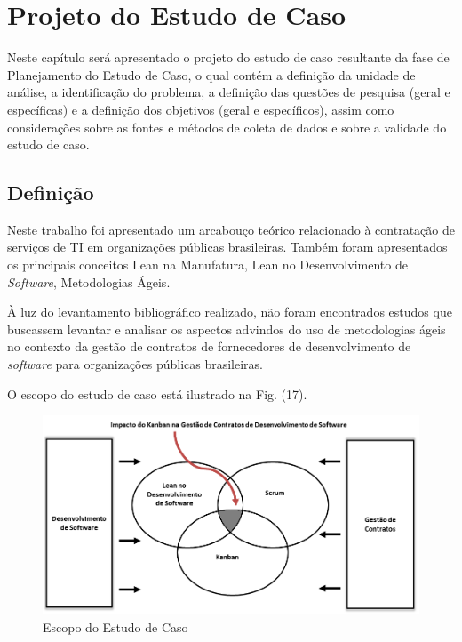 \chapter[Projeto do Estudo de Caso]{Projeto do Estudo de Caso}

Neste capítulo será apresentado o projeto do estudo de caso resultante da fase de Planejamento do Estudo de Caso, o qual contém a definição da unidade de análise,  a identificação do problema, a definição das questões de pesquisa (geral e específicas) e a definição dos objetivos (geral e específicos), assim como considerações sobre as fontes e métodos de coleta de dados e sobre a validade do estudo de caso.

\section[Definição]{Definição}

Neste trabalho foi apresentado um arcabouço teórico relacionado à contratação de serviços de TI em organizações públicas brasileiras. Também foram apresentados os principais conceitos Lean na Manufatura, Lean no Desenvolvimento de \textit{Software}, Metodologias Ágeis.

À luz do levantamento bibliográfico realizado, não foram encontrados estudos que buscassem levantar e analisar os aspectos advindos do uso de metodologias ágeis no contexto da gestão de contratos de fornecedores de desenvolvimento de \textit{software} para organizações públicas brasileiras.


O escopo do estudo de caso está ilustrado na Fig. (17). 
\begin{figure}[H]
		\centering
		\label{fig01}
			\includegraphics[scale=0.6]{figuras/escopoEC.png}
		\caption{Escopo do Estudo de Caso}
\end{figure}

